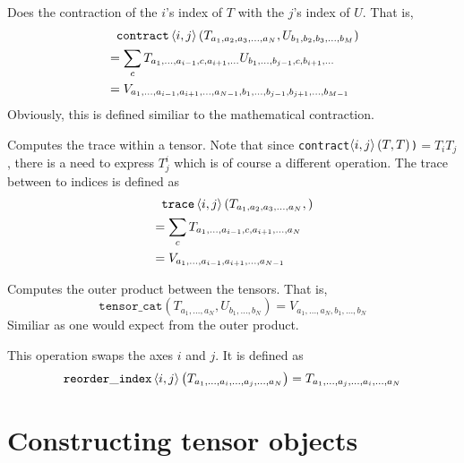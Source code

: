 \documentclass[a4paper]{article}
\begin{document}
\begin{description}[style=nextline]
\item[\texttt{contract$\braket{i,j}(T,U)$}]
Does the contraction of the $i$'s index of $T$ with the $j$'s index of $U$. That is,
\begin{align*}
&\phantom{=}
\mathtt{contract}\braket{i,j}\left(
   T_{a_1,a_2,a_3,\dots,a_N},
   U_{b_1,b_2,b_3,\dots,b_M}
\right) \\
&=
\sum_c
T_{a_1,\dots,a_{i-1},c,a_{i+1},\dots}
U_{b_1,\dots,b_{j-1},c,b_{i+1},\dots}
\\
&=
V_{a_1,\dots,a_{i-1},a_{i+1},\dots,a_{N-1},
   b_1,\dots,b_{j-1},b_{j+1},\dots,b_{M-1}}
\end{align*}
Obviously, this is defined similiar to the
mathematical contraction.

\item[\texttt{trace$\braket{i,j}(T)$}]
Computes the trace within a tensor. Note that
since
\texttt{contract$\braket{i,j}(T,T)$)}$=T_i T_j$,
there is a need to express $T^i_j$ which is
of course a different operation. The trace
between to indices is defined as
\begin{align*}
&\phantom{=}
\mathtt{trace}\braket{i,j}\left(
   T_{a_1,a_2,a_3,\dots,a_N},
\right) \\
&=
\sum_c
T_{a_1,\dots,a_{i-1},c,a_{i+1},\dots,a_N}
\\
&=
V_{a_1,\dots,a_{i-1},a_{i+1},\dots,a_{N-1}}
\end{align*}

\item[\texttt{tensor\_cat($T$,$U$)}]
Computes the outer product between the tensors.
That is,
\begin{equation*}
\mathtt{tensor\_cat}(
  T_{a_1,\dots,a_N},
  U_{b_1,\dots,b_N}
) = V_{a_1,\dots,a_N,b_1,\dots,b_N}
\end{equation*}
Similiar as one would expect from the outer
product.

\item[\texttt{reorder\_index<$i$,$j$>($T$)}]
This operation swaps the axes $i$ and $j$.
It is defined as
\begin{equation*}
\mathtt{reorder\_index}\braket{i,j}\left(
T_{a_1,\dots,a_i,\dots,a_j,\dots,a_N}
\right)
= T_{a_1,\dots,a_j,\dots,a_i,\dots,a_N}
\end{equation*}

\end{description}

\section{Constructing tensor objects}
\end{document}
